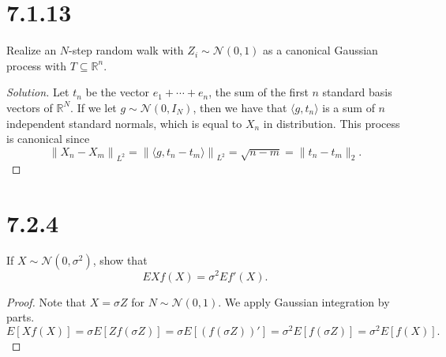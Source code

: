 \documentclass[11pt,letterpaper]{report}
\newcommand{\reals}{\mathbb{R}}
\newcommand{\mcal}[1]{\mathcal{#1}}
\newcommand{\Lp}[2]{\left\|{#1}\right\|_{L^{#2}}}
\newenvironment{solution}
{\begin{proof}[Solution]}
{\end{proof}}
\begin{document}
\section*{7.1.13}
Realize an $N$-step random walk with $Z_i\sim \mcal{N}(0,1)$ as a canonical Gaussian process with $T\subseteq \reals^n$.
\begin{solution}
	Let $t_n$ be the vector $e_1 + \cdots +e_n$, the sum of the first $n$ standard basis vectors of $\reals^N$. If we let $g\sim \mcal{N}(0, I_N)$, then we have that $\langle g, t_n\rangle$ is a sum of $n$ independent standard normals, which is equal to $X_n$ in distribution. This process is canonical since
	\[
	\Lp{X_n-X_m}{2} = \Lp{\langle g, t_n-t_m\rangle}{2} = \sqrt{n-m} = \|t_n-t_m\|_2.
	\]
\end{solution}











\section*{7.2.4}
If $X\sim \mcal{N}(0, \sigma^2)$, show that
\[
EXf(X) = \sigma^2Ef'(X).
\]
\begin{proof}
	Note that $X = \sigma Z$ for $N\sim \mcal{N}(0,1)$. We apply Gaussian integration by parts.
	\[
	E[Xf(X)] = \sigma E[Zf(\sigma Z)] = \sigma E[(f(\sigma Z))'] = \sigma^2E[f(\sigma Z)] = \sigma^2 E[f(X)].
	\]
\end{proof}
\end{document}
